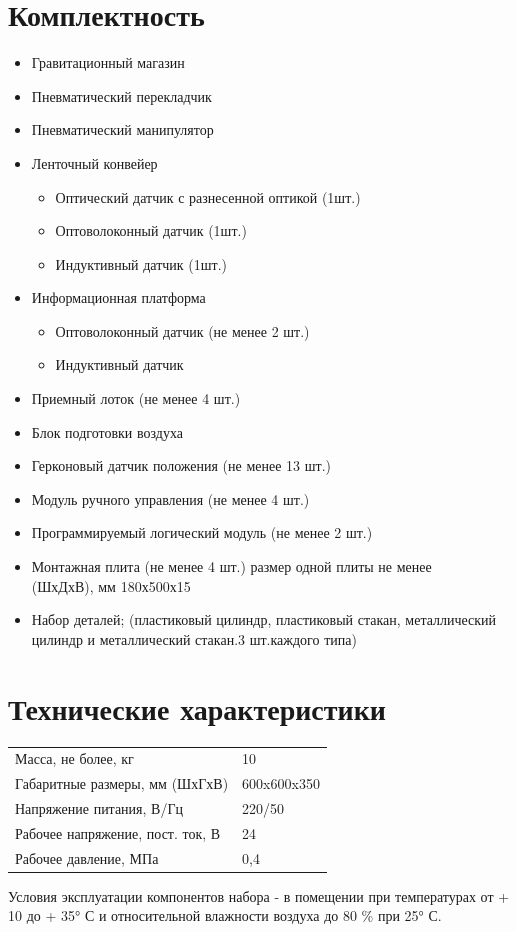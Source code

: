 \section{Комплектность}
\begin{itemize}
    \item Гравитационный магазин
    \item Пневматический перекладчик
    \item Пневматический манипулятор
    \item Ленточный конвейер
    \begin{itemize}
        \item Оптический датчик с разнесенной оптикой (1шт.)
        \item Оптоволоконный датчик (1шт.)
        \item Индуктивный датчик (1шт.)
    \end{itemize}
    \item Информационная платформа
    \begin{itemize}
        \item Оптоволоконный датчик (не менее 2 шт.)
        \item Индуктивный датчик
    \end{itemize}
    \item Приемный лоток (не менее 4 шт.)
    \item Блок подготовки воздуха
    \item Герконовый датчик положения (не менее 13 шт.)
    \item Модуль ручного управления (не менее 4 шт.)
    \item Программируемый логический модуль (не менее 2 шт.)
    \item Монтажная плита (не менее 4 шт.) размер одной плиты не менее\\(ШхДхВ), мм 180х500х15
    \item Набор деталей; (пластиковый цилиндр, пластиковый стакан, металлический цилиндр и металлический стакан.3 шт.каждого типа)
\end{itemize}

\section{Технические характеристики}
\begin{table}[hb]
    \centering
    \begin{tabular}{m{108mm}|l}
    Масса, не более, кг              & 10          \\
    Габаритные размеры, мм (ШхГхВ)   & 600x600x350 \\
    Напряжение питания, В/Гц         & 220/50      \\
    Рабочее напряжение, пост. ток, В & 24          \\
    Рабочее давление, МПа            & 0,4
    \end{tabular}
\end{table}

Условия эксплуатации компонентов набора - в помещении при температурах от + 10 до + 35° С и относительной влажности воздуха до 80 \% при 25° С.